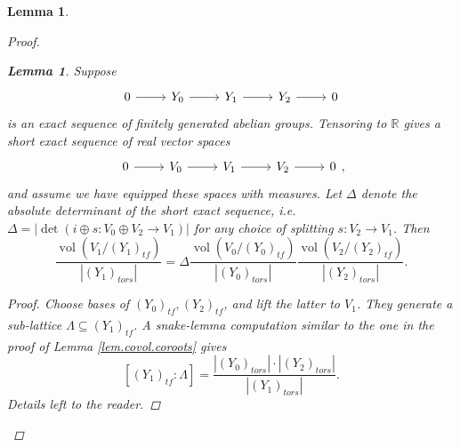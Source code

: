 \documentclass[openany]{amsbook}
\newtheorem{lemma}[theorem]{Lemma}
\theoremstyle{definition}
\theoremstyle{remark}
\numberwithin{equation}{section}
\newcommand{\R}{\mathbb{R}}
\newcommand{\vol}{\operatorname{vol}}
\renewcommand{\-}{\operatorname{-}}
\newcommand{\tors}{\mathit{tors}}
\newcommand{\tf}{\mathit{tf}}
\begin{document}
\begin{lemma}
\begin{proof}
        \begin{lemma}\label{lem.index.mult.ses.fg.gps}
            Suppose 
            $$
                \begin{tikzcd}
                    0 \ar[r] & Y_0 \ar[r] & Y_1 \ar[r] & Y_2 \ar[r] & 0
                \end{tikzcd}
            $$
            is an exact sequence of finitely generated abelian groups. Tensoring to $\R$ gives a short exact sequence of real vector spaces
            $$
                \begin{tikzcd}
                    0 \ar[r] & V_0 \ar[r] & V_1 \ar[r] & V_2 \ar[r] & 0
                \end{tikzcd},
            $$
            and assume we have equipped these spaces with measures. Let $\Delta$ denote the absolute determinant of the short exact sequence, i.e. $\Delta = |\det(i \oplus s : V_0 \oplus V_2 \to V_1)|$ for any choice of splitting $s: V_2 \to V_1$. Then
            \begin{equation}
                \frac{\vol(V_1/(Y_1)_{\tf})}{|(Y_1)_{\tors}|} = \Delta \frac{\vol(V_0/(Y_0)_{\tf})}{|(Y_0)_{\tors}|} \frac{\vol(V_2/(Y_2)_{\tf})}{|(Y_2)_{\tors}|}.\label{eqn.index.mult.ses.fg.gps}
            \end{equation}
            \begin{proof}
                Choose bases of $(Y_0)_{\tf}, (Y_2)_{\tf}$, and lift the latter to $V_1$. They generate a sub-lattice $\Lambda \subseteq (Y_1)_{\tf}$. A snake-lemma computation similar to the one in the proof of Lemma \ref{lem.covol.coroots} gives
                $$
                     [(Y_1)_{\tf} : \Lambda] = \frac{|(Y_0)_{\tors}| \cdot |(Y_2)_{\tors}|}{|(Y_1)_{\tors}|}.
                $$
                Details left to the reader.
            \end{proof}
        \end{lemma}


\end{proof}
\end{lemma}
\end{document}
